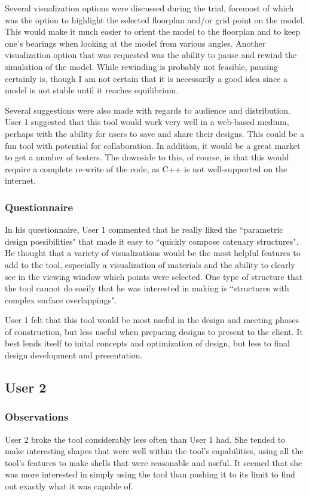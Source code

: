 \documentclass{thesis}
\begin{document}
Several visualization options were discussed during the trial, foremost of which was the option to highlight the selected floorplan
and/or grid point on the model.  This would make it much easier to orient the model to the floorplan and to keep one's bearings
when looking at the model from various angles.  Another visualization option that was requested was the ability to pause and rewind
the simulation of the model.  While rewinding is probably not feasible, pausing certainly is, though I am not certain that it is
necessarily a good idea since a model is not stable until it reaches equilibrium.

Several suggestions were also made with regards to audience and distribution.  User 1 suggested that this tool would work very well in
a web-based medium, perhaps with the ability for users to save and share their designs.  This could be a fun tool with potential for
collaboration.  In addition, it would be a great market to get a number of testers.  The downside to this, of course, is that this
would require a complete re-write of the code, as C++ is not well-supported on the internet.

\subsubsection{Questionnaire}
In his questionnaire, User 1 commented that he really liked the ``parametric design possibilities" that made it easy to ``quickly compose
catenary structures".  He thought that a variety of visualizations would be the most helpful features to add to the tool, especially
a visualization of materials and the ability to clearly see in the viewing window which points were selected.  One type of structure
that the tool cannot do easily that he was interested in making is ``structures with complex surface overlappings".

User 1 felt that this tool would be most useful in the design and meeting phases of construction, but less useful when preparing
designs to present to the client.  It best lends itself to inital concepts and optimization of design, but less to final design
development and presentation.

\subsection{User 2}
\subsubsection{Observations}
User 2 broke the tool considerably less often than User 1 had.  She tended to make interesting shapes that were well within the tool's
capabilities, using all the tool's features to make shells that were reasonable and useful.  It seemed that she was more interested in
simply using the tool than pushing it to its limit to find out exactly what it was capable of.
\end{document}
